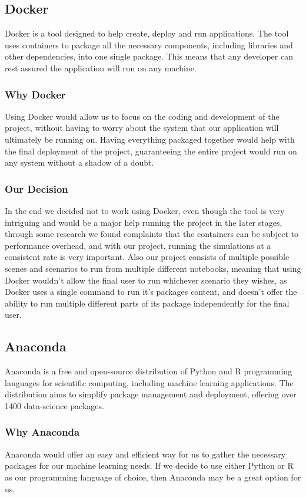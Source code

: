 \subsection{Docker}
Docker is a tool designed to help create, deploy and run applications. The tool uses containers to package all the necessary components, including libraries and other dependencies, into one single package. This means that any developer can rest assured the application will run on any machine.

\subsubsection{Why Docker}
Using Docker would allow us to focus on the coding and development of the project, without having to worry about the system that our application will ultimately be running on. Having everything packaged together would help with the final deployment of the project, guaranteeing the entire project would run on any system without a shadow of a doubt.

\subsubsection{Our Decision}
In the end we decided not to work using Docker, even though the tool is very intriguing and would be a major help running the project in the later stages, through some research we found complaints that the containers can be subject to performance overhead, and with our project, running the simulations at a consistent rate is very important. Also our project consists of multiple possible scenes and scenarios to run from multiple different notebooks, meaning that using Docker wouldn’t allow the final user to run whichever scenario they wishes, as Docker uses a single command to run it’s packages content, and doesn’t offer the ability to run multiple different parts of its package independently for the final user.

\subsection{Anaconda}
Anaconda is a free and open-source distribution of Python and R programming languages for scientific computing, including machine learning applications. The distribution aims to simplify package management and deployment, offering over 1400 data-science packages.

\subsubsection{Why Anaconda}
Anaconda would offer an easy and efficient way for us to gather the necessary packages for our machine learning needs. If we decide to use either Python or R as our programming language of choice, then Anaconda may be a great option for us.

